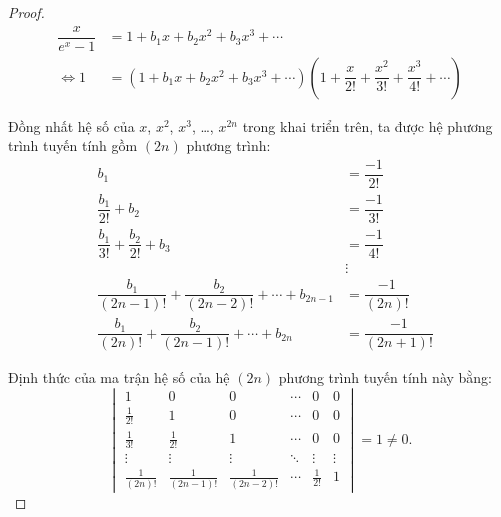 \documentclass[class=linearalgebra,crop=false]{standalone}
\begin{document}
\begin{proof}
    \begingroup
    \allowdisplaybreaks
    \begin{align*}
        \dfrac{x}{e^{x}-1} & = 1 + b_{1}x + b_{2}x^{2} + b_{3}x^{3} + \cdots                                                                                  \\
        \Leftrightarrow 1  & = (1 + b_{1}x + b_{2}x^{2} + b_{3}x^{3} + \cdots)\left(1 + \dfrac{x}{2!} + \dfrac{x^{2}}{3!} + \dfrac{x^{3}}{4!} + \cdots\right)
    \end{align*}
    \endgroup
    \par Đồng nhất hệ số của $x$, $x^{2}$, $x^{3}$, \ldots, $x^{2n}$ trong khai triển trên, ta được hệ phương trình tuyến tính gồm $(2n)$ phương trình:
    \begin{align*}
         & b_{1}                                                               & = \dfrac{-1}{2!}      \\
         & \dfrac{b_{1}}{2!} + b_{2}                                           & = \dfrac{-1}{3!}      \\
         & \dfrac{b_{1}}{3!} + \dfrac{b_{2}}{2!} + b_{3}                       & = \dfrac{-1}{4!}      \\
         &                                                                     & \vdots                \\
         & \dfrac{b_{1}}{(2n-1)!} + \dfrac{b_{2}}{(2n-2)!} + \cdots + b_{2n-1} & = \dfrac{-1}{(2n)!}   \\
         & \dfrac{b_{1}}{(2n)!} + \dfrac{b_{2}}{(2n-1)!} + \cdots + b_{2n}     & = \dfrac{-1}{(2n+1)!}
    \end{align*}
    \par Định thức của ma trận hệ số của hệ $(2n)$ phương trình tuyến tính này bằng:
    \[
        \begin{vmatrix}
            1               & 0                 & 0                 & \cdots & 0            & 0      \\
            \frac{1}{2!}    & 1                 & 0                 & \cdots & 0            & 0      \\
            \frac{1}{3!}    & \frac{1}{2!}      & 1                 & \cdots & 0            & 0      \\
            \vdots          & \vdots            & \vdots            & \ddots & \vdots       & \vdots \\
            \frac{1}{(2n)!} & \frac{1}{(2n-1)!} & \frac{1}{(2n-2)!} & \cdots & \frac{1}{2!} & 1
        \end{vmatrix} = 1 \ne 0.
\]
\end{proof}
\end{document}
